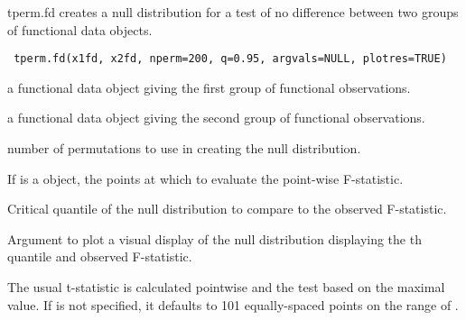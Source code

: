 \begin{Description}\relax
tperm.fd creates a null distribution for a test of no difference between two
groups of functional data objects.
\end{Description}
\begin{Usage}
\begin{verbatim}
 tperm.fd(x1fd, x2fd, nperm=200, q=0.95, argvals=NULL, plotres=TRUE)
\end{verbatim}
\end{Usage}
\begin{Arguments}
\begin{ldescription}
\item[\code{x1fd}] a functional data object giving the first group of functional observations.

\item[\code{x2fd}] a functional data object giving the second group of functional
observations.

\item[\code{nperm}] number of permutations to use in creating the null distribution.

\item[\code{argvals}] If  is a  object, the points at which to evaluate
the point-wise F-statistic.

\item[\code{q}] Critical quantile of the null distribution to compare to the observed
F-statistic.

\item[\code{plotres}] Argument to plot a visual display of the null distribution displaying the
th quantile and observed F-statistic.

\end{ldescription}
\end{Arguments}
\begin{Details}\relax
The usual t-statistic is calculated pointwise and the test based on the
maximal value. If  is not specified,
it defaults to 101 equally-spaced points on the range of .
\end{Details}
